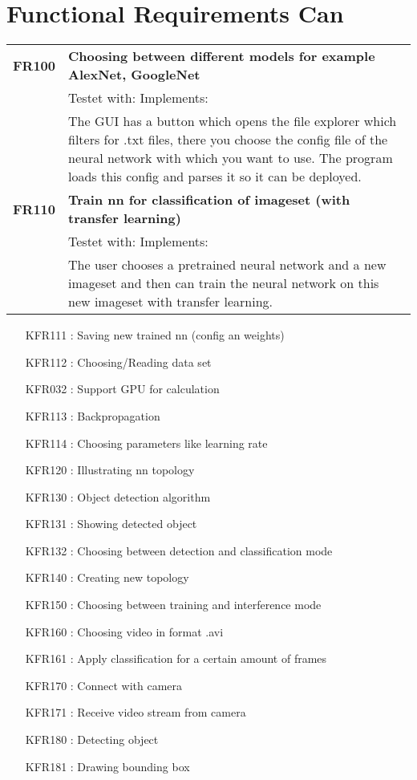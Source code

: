 \documentclass[parskip=full]{scrartcl}
\begin{document}
\section{Functional Requirements Can}
\begin{tabular}{p{2cm}p{12cm}}
\textbf{FR100} & \textbf{Choosing between different models for example AlexNet, GoogleNet}\\
& Testet with: Implements: \\
& The GUI has a button which opens the file explorer which filters for .txt files, there you choose the config file of the neural network with which you want to use. The program loads this config and parses it so it can be deployed.\\
\textbf{FR110} & \textbf{Train nn for classification of imageset (with transfer learning)}\\
& Testet with: Implements: \\
& The user chooses a pretrained neural network and a new imageset and then can train the neural network on this new imageset with transfer learning.
\end{tabular}
\begin{itemize}[nosep]
\item [KFR111]: Saving new trained nn (config an weights)
\item [KFR112]: Choosing/Reading data set
\item [KFR032]: Support GPU for calculation
\item [KFR113]: Backpropagation
\item [KFR114]: Choosing parameters like learning rate
\item [KFR120]: Illustrating nn topology
\item [KFR130]: Object detection algorithm
\item [KFR131]: Showing detected object
\item [KFR132]: Choosing between detection and classification mode
\item [KFR140]: Creating new topology
\item [KFR150]: Choosing between training and interference mode
\item [KFR160]: Choosing video in format .avi
\item [KFR161]: Apply classification for a certain amount of frames
\item [KFR170]: Connect with camera 
\item [KFR171]: Receive video stream from camera
\item [KFR180]: Detecting object
\item [KFR181]: Drawing bounding box 

\end{itemize}
\end{document}
